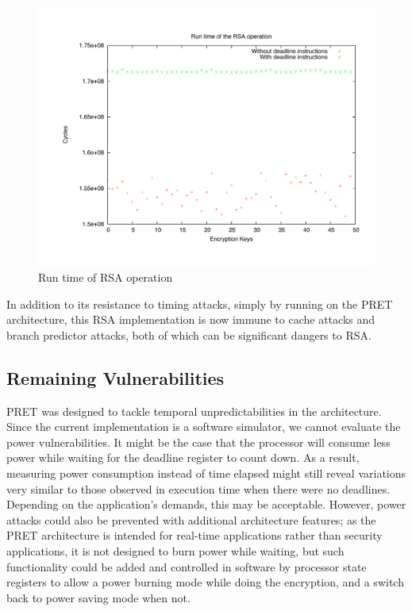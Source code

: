 \documentclass[times, 10pt,twocolumn]{article}
\begin{document}
\begin{figure}[ht]
  \centering
  \includegraphics[scale=.3]{./images/RSA.pdf}
  \caption{Run time of RSA operation}
  \label{fig:rsa}
\end{figure}

In addition to its resistance to timing attacks, simply by running on the PRET architecture, this RSA implementation is now immune to cache attacks and branch predictor attacks, both of which can be significant dangers to RSA\cite{branchpredict, Percival05cachemissing}.

\subsection{Remaining Vulnerabilities}
PRET was designed to tackle temporal unpredictabilities in the architecture. Since the current implementation is a software simulator, we cannot evaluate the power vulnerabilities. It might be the case that the processor will consume less power while waiting for the deadline register to count down. As a result, measuring power consumption instead of time elapsed might still reveal variations very similar to those observed in execution time when there were no deadlines.  Depending on the application's demands, this may be acceptable.  However, power attacks could also be prevented with additional architecture features; as the PRET architecture is intended for real-time applications rather than security applications, it is not designed to burn power while waiting, but such functionality could be added and controlled in software by processor state registers to allow a power burning mode while doing the encryption, and a switch back to power saving mode when not.  
\end{document}
